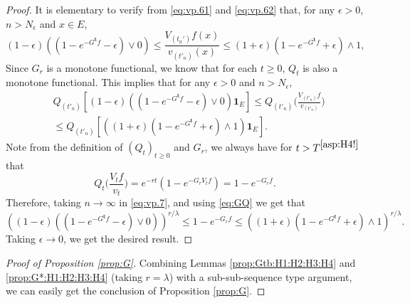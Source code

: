 \documentclass[12pt,a4paper]{amsart}
\numberwithin{equation}{section}
\theoremstyle{plain}
\theoremstyle{definition}
\theoremstyle{remark}
\begin{document}
\begin{proof}
	It is elementary to verify from \eqref{eq:vp.61} and \eqref{eq:vp.62} that, for any $\epsilon>0$, $n>N_\epsilon$ and $x\in E$,
\[
	(1-\epsilon) \left((1 - e^{- G^{\mathbf t}f} - \epsilon)\vee 0\right) %
	\leq \frac{V_{(t_n')}f(x)}{v_{(t'_n)}(x)} %
	\leq (1+\epsilon) ( 1 - e^{- G^{\mathbf t}f} + \epsilon) \wedge 1, %
\]
	Since $G_r$ is a monotone functional, we know that for each $t\geq 0$, $Q_t$ is also a monotone functional.
	This implies that  for any $\epsilon>0$ and $n>N_\epsilon$,
\begin{align} \label{eq:vp.7}
	&Q_{(t'_n)} \left[(1-\epsilon) \left((1 - e^{- G^{\mathbf t}f} - \epsilon)\vee 0\right) \mathbf 1_E \right]
	\leq Q_{(t'_n)}\Big( \frac{V_{(t'_n)}f}{v_{(t'_n)}} \Big)
	\\&\leq Q_{(t'_n)}\left[ \left((1+\epsilon) ( 1 - e^{- G^{\mathbf t}f} + \epsilon) \wedge 1\right)\mathbf 1_E \right].
\end{align}
	Note from the definition of $(Q_t)_{t\geq 0}$ and $G_r$, we always have for $t>T^{\eqref{asp:H4!}}$ that
\[
	Q_t \Big( \frac{V_tf}{v_t}  \Big)
	= e^{- r t}( 1 - e^{- G_rV_tf}  )
	= 1- e^{- G_r f}.
\]
	Therefore, taking $n \to \infty$ in \eqref{eq:vp.7}, and using \eqref{eq:GQ}  we get that
\[
	\left((1-\epsilon) \left((1 - e^{- G^{\mathbf t}f} - \epsilon)\vee 0\right) \right)^{r/\lambda}
	\leq 1 - e^{- G_r f}
	 \leq \left((1 + \epsilon) (1 - e^{- G^{\mathbf t} f} + \epsilon)\wedge 1 \right)^{r/\lambda}.
\]
	Taking $\epsilon \to 0$, we get the desired result.
\end{proof}

\begin{proof}[Proof of Proposition \ref{prop:G}]
	Combining  Lemmas \ref{prop:Gtb:H1:H2:H3:H4} and \ref{prop:G*:H1:H2:H3:H4}
	(taking $r=\lambda$) 
	with a sub-sub-sequence type argument, we can easily get the conclusion of Proposition \ref{prop:G}.
\end{proof}
\end{document}
